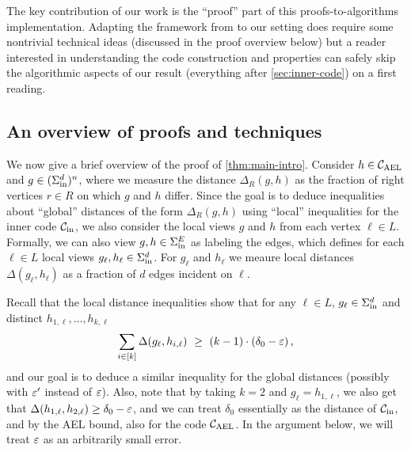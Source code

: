 The key contribution of our work is the ``proof'' part of this
proofs-to-algorithms implementation.
%
Adapting the framework from \cite{JST23} to our setting does require some nontrivial technical ideas (discussed in the proof overview
below) but a reader interested in understanding the code construction and properties can safely skip the algorithmic aspects of our result (everything after \cref{sec:inner-code}) on a first reading.

\subsection{An overview of proofs and techniques}
%
We now give a brief overview of the proof of \cref{thm:main-intro}. 
%
Consider $h \in { {\mathcal C}_{\mathrm{AEL}} }$ and $g \in (\Sigma_{\mathrm{in}}^d)^n$, where we measure the distance
$\Delta_R(g,h)$ as the fraction of right vertices $r \in R$ on which $g$ and $h$ differ.
%
Since the goal is to deduce inequalities about ``global'' distances of the form $\Delta_R(g,h)$
using ``local'' inequalities for the inner code ${\mathcal C}_{\mathrm{in}}$, we also consider the local views
$g$ and $h$ from each vertex $\ell \in L$.
%
Formally, we can also view $g, h \in \Sigma_{\mathrm{in}}^E$ as labeling the edges, which defines for each
$\ell \in L$ local views $g_{\ell}, h_{\ell} \in \Sigma_{\mathrm{in}}^d$.  For $g_{\ell}$ and $h_{\ell}$ we meaure local
distances $\Delta(g_{\ell}, h_{\ell})$ as a fraction of $d$ edges incident on $\ell$.

Recall that the local distance inequalities show that for any $\ell \in L$, $g_{\ell} \in
\Sigma_{\mathrm{in}}^d$ and distinct $h_{1,\ell}, \ldots, h_{k,\ell}$
\[
\sum_{i \in [k]} \Delta(g_{\ell}, h_{i,\ell}) ~\geq~ (k-1) \cdot (\delta_0 - \varepsilon) \,,
\]
and our goal is to deduce a similar inequality for the global distances (possibly with $\varepsilon'$ instead of
$\varepsilon$).
%
Also, note that by taking
$k=2$ and $g_{\ell} = h_{1,\ell}$, we also get that $\Delta(h_{1,\ell},h_{2,\ell}) \geq \delta_0 -
\varepsilon$, and we can treat $\delta_0$ essentially as the distance of ${\mathcal C}_{\mathrm{in}}$, and by the AEL
bound, also for the code ${ {\mathcal C}_{\mathrm{AEL}} }$.
%
In the argument below, we will treat $\varepsilon$ as an arbitrarily small error.

\vspace{-10 pt}
